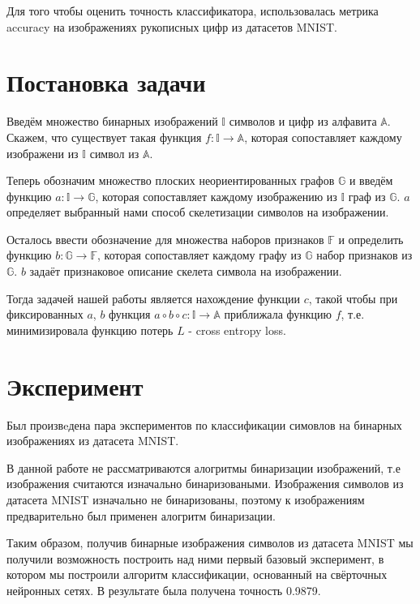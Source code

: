 \documentclass{llncs}
\begin{document}
Для того чтобы оценить точность классификатора, использовалась метрика accuracy на изображениях рукописных цифр из датасетов MNIST.

\section{Постановка задачи}

Введём множество бинарных изображений $\mathbb{I}$ символов и цифр из алфавита $\mathbb{A}$. Скажем, что существует такая функция $f: \mathbb{I} \rightarrow \mathbb{A}$, которая сопоставляет каждому изображени из $\mathbb{I}$ символ из $\mathbb{A}$.

Теперь обозначим множество плоских неориентированных графов $\mathbb{G}$ и введём функцию $a: \mathbb{I} \rightarrow \mathbb{G}$, которая сопоставляет каждому изображению из $\mathbb{I}$ граф из $\mathbb{G}$. $a$ определяет выбранный нами способ скелетизации символов на изображении.

Осталось ввести обозначение для множества наборов признаков $\mathbb{F}$ и определить функцию $b: \mathbb{G} \rightarrow \mathbb{F}$, которая сопоставляет каждому графу из $\mathbb{G}$ набор признаков из $\mathbb{G}$. $b$ задаёт признаковое описание скелета символа на изображении.

Тогда задачей нашей работы является нахождение функции $c$, такой чтобы при фиксированных $a$, $b$ функция $a \circ b \circ c: \mathbb{I} \rightarrow \mathbb{A}$ приближала функцию $f$, т.е. минимизировала функцию потерь $L$ - cross entropy loss.

\section{Эксперимент}

Был произвeдена пара экспериментов по классификации симовлов на бинарных изображениях из датасета MNIST.

В данной работе не рассматриваются алогритмы бинаризации изображений, т.е изображения считаются изначально бинаризоваными. Изображения символов из датасета MNIST изначально не бинаризованы, поэтому к изображениям предварительно был применен алогритм бинаризации.

Таким образом, получив бинарные изображения символов из датасета MNIST мы получили возможность построить над ними первый базовый эксперимент, в котором мы построили алгоритм классификации, основанный на свёрточных нейронных сетях. В результате была получена точность 0.9879.
\end{document}

